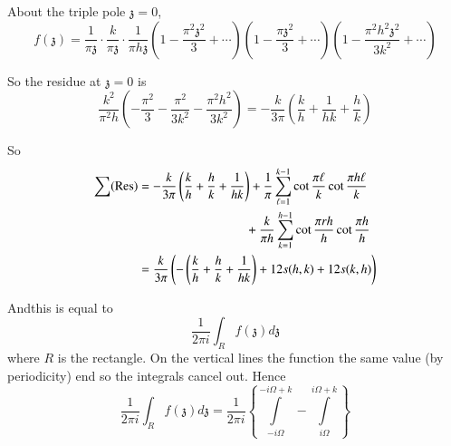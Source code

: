 About the triple pole $\mathfrak{z}=0$, 
$$
f(\mathfrak{z}) = \frac{1}{\pi \mathfrak{z}}\cdot \frac{k}{ \pi
  \mathfrak{z}} \cdot \frac{1}{\pi h \mathfrak{z}} \left( 1- \frac{\pi^2
\mathfrak{z}^2}{3} + \cdots \right) \left( 1- \frac{\pi
    \mathfrak{z}^2}{3} + \cdots\right) \left(1- \frac{\pi^2 h^2
    \mathfrak{z}^2}{3k^2} + \cdots \right)
$$
\begin{figure}[H]
\end{figure}

So the residue at $\mathfrak{z}=0$ is 
$$
\frac{k^2}{\pi^2 h} \left(- \frac{\pi^2}{3} - \frac{\pi^2}{3k^2} -
\frac{\pi^2 h^2}{3k^2} \right)= - \frac{k}{3 \pi} \left( \frac{k}{h} +
\frac{1}{hk} + \frac{h}{k}\right)
$$

So 
\begin{align*}
  \sum (\Res) & = - \frac{k}{3 \pi} \left(\frac{k}{h} + \frac{h}{k} +
  \frac{1}{hk}\right)+ \frac{1}{\pi} \sum^{k-1}_{\ell=1} \cot
  \frac{\pi \ell}{k} \cot \frac{\pi h \ell}{k}\\ 
  & \hspace{3cm}+ \frac{k}{\pi h}
  \sum^{h-1}_{k=1} \cot \frac{\pi r h}{h} \cot \frac{\pi h}{h}\\
  & = \frac{k}{3 \pi} \left(- \left(\frac{k}{h} + \frac{h}{k} +
  \frac{1}{hk} \right) + 12 s(h, k)+ 12 s(k, h)\right) 
\end{align*}

And\pageoriginale this is equal to 
$$
\frac{1}{2 \pi i} \int_R f(\mathfrak{z}) d \mathfrak{z}
$$
where $R$ is the rectangle. On the vertical lines the function the
same value (by periodicity) end so the integrals cancel out. Hence
$$
\frac{1}{2 \pi i} \int_R f(\mathfrak{z}) d \mathfrak{z} = \frac{1}{2
  \pi i} \left\{\int\limits^{- i \Omega + k}_{- i \Omega}-
\int\limits^{i \Omega + k}_{i \Omega} \right\}
$$

